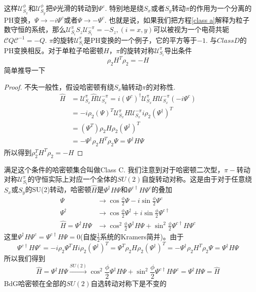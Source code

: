 \documentclass[a4paper]{article}
\numberwithin{equation}{subsection}
\newtheorem{proof}{证明}
\newcommand{\mC}{\mathcal{C}}
\newcommand{\mU}{\mathcal{U}}
\begin{document}
这样$\mU_{S_x}^\phi$和$\mU_{S_y}^\phi$把$\Psi$光滑的转动到$\Psi^c$. 特别地是绕$S_x$或者$S_y$转动$\pi$的作用为一个分离的PH变换，$\Psi\rightarrow-i\Psi^c$或者$\Psi\rightarrow-\Psi^c$. 也就是说，如果我们把方程\eqref{class a}解释为粒子数守恒的系统，那么$\mU_{S_i}^\pi S_z\mU_{S_i}^{-\pi}=-S_z,(i=x,y)$可以被视为一个电荷共轭$\mC Q\mC^{-1}=-Q$. $\pi$的旋转$\mU_{S_i}^\pi$是PH变换的一个例子，它的平方等于$-1$. 与$Class D$的PH变换相反。对于单粒子哈密顿$H$，$\pi$的旋转对称$\mU_{S_i}^\pi$导出条件
\begin{equation}
    \rho_2H^T\rho_2=-H
\end{equation}
简单推导一下
\begin{proof}
    不失一般性，假设哈密顿有绕$S_x$轴转动$\pi$的对称性. 
    \begin{equation}
        \begin{split}
            \hat{H}&=\mU_{S_x}^\pi\hat{H}\mU_{S_x}^{-\pi}=i(\Psi^{c})^\dagger \mU_{S_x}^\pi H\mU_{S_x}^{-\pi}(-i\Psi^c)\\
            &=-i\rho_2(\Psi)^T\mU_{S_x}^\pi H\mU_{S_x}^{-\pi}i\rho_2(\Psi^\dagger)^T\\
            &=(\Psi^T)\rho_2H\rho_2(\Psi^\dagger)^T\\
            &=-\Psi^\dagger \rho_2H^T\rho_2\Psi=\Psi^\dagger H\Psi
        \end{split}
    \end{equation}
    所以得到$\rho_2^TH^T\rho_2=-H$
\end{proof}
满足这个条件的哈密顿集合叫做Class C. 我们注意到对于哈密顿二次型，$\pi-$转动对称$\mU_{S_i}^\pi$的守恒实际上对应一个全体的$SU(2)$自旋转动对称。这是由于对于任意绕$S_x$或$S_y$的SU(2)转动，哈密顿$\hat{H}$是$\Psi^\dagger H\Psi$和$\Psi^{c\dagger}H\Psi^c$的叠加
\begin{equation}
    \begin{split}
        \Psi&\rightarrow\cos\frac{\phi}{2}\Psi-i\sin\frac{\phi}{2}\Psi^c\\
        \Psi^\dagger&\rightarrow\cos\frac{\phi}{2}\Psi^\dagger+i\sin\frac{\phi}{2}\Psi^{c\dagger}\\
        \hat{H}=\Psi^\dagger H\Psi&\rightarrow\cos^2\frac{\phi}{2}\Psi^\dagger H\Psi+\sin^2\frac{\phi}{2}\Psi^{c\dagger}H\Psi^{c}
    \end{split}
\end{equation}
这里$\Psi^\dagger H\Psi^c=\Psi^{c\dagger}H\Psi=0$(自旋$\frac{1}{2}$系统的Kramers简并)。由于
\begin{equation}
    \Psi^{c\dagger}H\Psi^c=-i\rho_2\Psi^THi\rho_2(\Psi^\dagger)^T=\Psi^T\rho_2 H\rho_2(\Psi^\dagger)^T=-\Psi^\dagger\rho_2 H^T\rho_2\Psi=\Psi^\dagger H\Psi
\end{equation}
所以我们得到
\begin{equation}
    \hat{H}=\Psi^\dagger H\Psi\xrightarrow{SU(2)}\cos^2\frac{\phi}{2}\Psi^\dagger H\Psi+\sin^2\frac{\phi}{2}\Psi^{c\dagger}H\Psi^{c}=\Psi^\dagger H\Psi=\hat{H}
\end{equation}
BdG哈密顿在全部的$SU(2)$自选转动对称下是不变的
\end{document}
